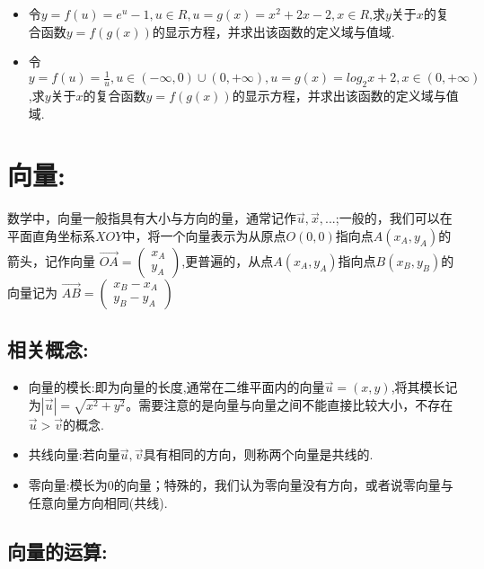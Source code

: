 \documentclass[UTF8]{article}
\begin{document}
\begin{itemize}
	\item 令$y = f(u) = e^u - 1, u \in R, u = g(x) = x^2 + 2x - 2, x \in R$,求$y$关于$x$的复合函数$y = f(g(x))$的显示方程，并求出该函数的定义域与值域.

	\item 令$y = f(u) = \frac{1}{u}, u \in (-\infty, 0)\cup (0, +\infty), u = g(x) = log_2 x + 2, x \in (0, +\infty)$,求$y$关于$x$的复合函数$y = f(g(x))$的显示方程，并求出该函数的定义域与值域.
\end{itemize}


\section{向量:}

数学中，向量一般指具有大小与方向的量，通常记作$\vec{u}, \vec{x}, ... $;一般的，我们可以在平面直角坐标系$XOY$中，将一个向量表示为从原点$O(0, 0)$指向点$A(x_A, y_A)$的箭头，记作向量
$
\overrightarrow{OA} = 
\left(
\begin{array}{l}
x_A\\
y_A
\end{array}
\right)
$,更普遍的，从点$A(x_A, y_A)$指向点$B(x_B, y_B)$的向量记为
$
\overrightarrow{AB} = 
\left(
\begin{array}{l}
x_B - x_A\\
y_B - y_A
\end{array}
\right)
$


\subsection{相关概念:}

\begin{itemize}
	\item 向量的模长:即为向量的长度,通常在二维平面内的向量$\vec{u} = (x, y)$,将其模长记为$|\vec{u}| = \sqrt{x^2 + y^2}$。需要注意的是向量与向量之间不能直接比较大小，不存在$\vec{u} > \vec{v}$的概念.
	\item 共线向量:若向量$\vec{u}, \vec{v}$具有相同的方向，则称两个向量是共线的.
	\item 零向量:模长为0的向量；特殊的，我们认为零向量没有方向，或者说零向量与任意向量方向相同(共线).
	
\end{itemize}


\subsection{向量的运算:}
\end{document}
